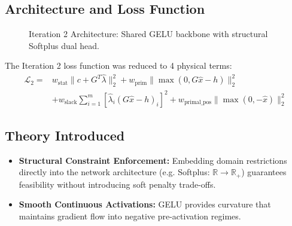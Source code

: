 \documentclass[11pt,a4paper]{article}
\begin{document}
\subsection{Architecture and Loss Function}

\begin{figure}[H]
\centering
{}
\caption{Iteration 2 Architecture: Shared GELU backbone with structural Softplus dual head.}
\end{figure}

The Iteration 2 loss function was reduced to 4 physical terms:
\begin{equation}
\begin{aligned}
    \mathcal{L}_2 = {} & w_{\text{stat}} \| c + G^T \hat{\lambda} \|_2^2 + w_{\text{prim}} \| \max(0, G \hat{x} - h) \|_2^2 \\
    & + w_{\text{slack}} \sum_{i=1}^m \left[\hat{\lambda}_i (G\hat{x} - h)_i\right]^2 + w_{\text{primal\_pos}} \| \max(0, -\hat{x}) \|_2^2
\end{aligned}
\end{equation}

\subsection{Theory Introduced}
\begin{itemize}[leftmargin=1.5em, itemsep=2pt]
    \item \textbf{Structural Constraint Enforcement:} Embedding domain restrictions directly into the network architecture (e.g. Softplus: $\mathbb{R} \to \mathbb{R}_{+}$) guarantees feasibility without introducing soft penalty trade-offs.
    \item \textbf{Smooth Continuous Activations:} GELU provides curvature that maintains gradient flow into negative pre-activation regimes.
\end{itemize}
\end{document}
